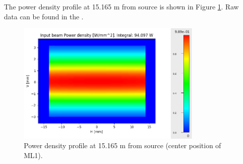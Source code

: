 The power density profile at 15.165 m from source is shown in Figure \ref{fig:power_profile_ML1}. Raw data can be found in the \powerprofilesurl. \\
\begin{figure}[ht]
\centering
\includegraphics[width=0.8\textwidth]{./../../power_profiles/power_profile_ML1.png}
\caption{\label{fig:power_profile_ML1} Power density profile at 15.165 m from source (center position of ML1).}
\end{figure}